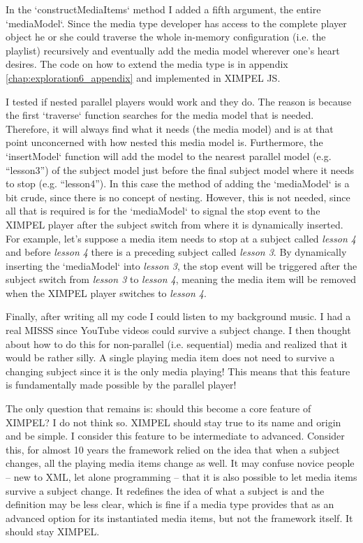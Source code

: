 In the `constructMediaItems` method I added a fifth argument, the entire `mediaModel`. Since the media type developer has access to the complete player object he or she could traverse the whole in-memory configuration (i.e. the playlist) recursively and eventually add the media model wherever one's heart desires. The code on how to extend the media type is in appendix \ref{chap:exploration6_appendix} and implemented in XIMPEL JS.

I tested if nested parallel players would work and they do. The reason is because the first `traverse` function searches for the media model that is needed. Therefore, it will always find what it needs (the media model) and is at that point unconcerned with how nested this media model is. Furthermore, the `insertModel` function will add the model to the nearest parallel model (e.g. ``lesson3'') of the subject model just before the final subject model where it needs to stop (e.g. ``lesson4''). In this case the method of adding the `mediaModel` is a bit crude, since there is no concept of nesting. However, this is not needed, since all that is required is for the `mediaModel` to signal the stop event to the XIMPEL player after the subject switch from where it is dynamically inserted. For example, let's suppose a media item needs to stop at a subject called \textit{lesson 4} and before \textit{lesson 4} there is a preceding subject called \textit{lesson 3}. By dynamically inserting the `mediaModel` into \textit{lesson 3}, the stop event will be triggered after the subject switch from \textit{lesson 3} to \textit{lesson 4}, meaning the media item will be removed when the XIMPEL player switches to \textit{lesson 4}.

Finally, after writing all my code I could listen to my background music. I had a real MISSS since YouTube videos could survive a subject change. I then thought about how to do this for non-parallel (i.e. sequential) media and realized that it would be rather silly. A single playing media item does not need to survive a changing subject since it is the only media playing! This means that this feature is fundamentally made possible by the parallel player!

The only question that remains is: should this become a core feature of XIMPEL? I do not think so. XIMPEL should stay true to its name and origin and be simple. I consider this feature to be intermediate to advanced. Consider this, for almost 10 years the framework relied on the idea that when a subject changes, all the playing media items change as well. It may confuse novice people -- new to XML, let alone programming -- that it is also possible to let media items survive a subject change. It redefines the idea of what a subject is and the definition may be less clear, which is fine if a media type provides that as an advanced option for its instantiated media items, but not the framework itself. It should stay XIMPEL.


